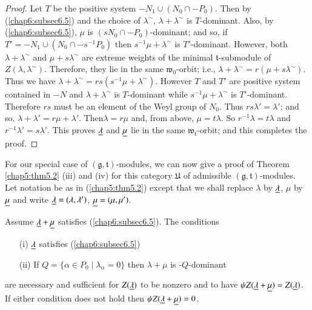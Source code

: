 \begin{proof}
Let $T$ be the positive system $-N_1 \cup (N_0 \cap -P_0)$. Then by
(\ref{chap6:subsec6.5}) and the choice of $\lambda^\sim$, $\lambda + \lambda^\sim$ is
$T$-dominant. Also, by (\ref{chap6:subsec6.5}), $\mu$ is $(sN_0 \cap -P_0)$-dominant;
and so, if $T'= - N_1 \cup (N_0 \cap - s^{-1}P_0)$ then $s^{-1} \mu +
\lambda^\sim$ is $T'$-dominant. However, both $\lambda + \lambda^\sim$
and $\mu + s \lambda^\sim$ are extreme weights of the minimal
$\mathfrak{t}$-submodule of $Z(\lambda, \lambda^\sim)$. Therefore,
they lie in the same $\mathfrak{w}_0$-orbit; i.e., $\lambda+
\lambda^\sim = r(\mu + s\lambda^\sim)$. Thus we have $\lambda +
\lambda^\sim = rs (s^{-1} \mu + \lambda^\sim)$. However $T$ and $T'$
are positive system contained in $-N$ and $\lambda + \lambda^\sim$ is
$T$-dominant while $s^{-1} \mu + \lambda^\sim$ is
$T'$-dominant. Therefore $rs$ must be an element of the Weyl group of
$N_0$. Thus $rs\lambda' = \lambda'$; and so, $\lambda+ \lambda' = r\mu
+ \lambda'$. Then\pageoriginale $\lambda = r\mu$ and, from above, $\mu
= t\lambda$. So $r^{-1} \lambda = t\lambda$ and $r^{-1} \lambda' =
s\lambda'$. This proves $\underline{\lambda}$ and $\underline{\mu}$ lie in the
same $\mathfrak{w}_\mathfrak{t}$-orbit; and this completes the proof. 
\end{proof}

For our special case of $(\mathfrak{g}, \mathfrak{t})$-modules, we can
now give a proof of Theorem \ref{chap5:thm5.2} (iii) and (iv) for this category
$\mathfrak{U}$ of admissible $(\mathfrak{g},
\mathfrak{t})$-modules. Let notation be as in (\ref{chap5:thm5.2}) except that we
shall replace $\lambda$ by $\underline{\lambda}$, $\mu$ by $\underline{\mu}$ and write
$\underline{\lambda} = (\lambda, \lambda')$, $\underline{\mu} = (\mu, \mu')$. 

\begin{prop}\label{chap10:prop10.9}
Assume $\underline{\lambda} + \underline{\mu}$ satisfies (\ref{chap6:subsec6.5}). The conditions
\begin{itemize}
\item[{\rm (i)}] $\underline{\lambda}$ satisfies (\ref{chap6:subsec6.5})

\item[{\rm (ii)}] If $Q = \{\alpha \in P_0 \mid \lambda_\alpha = 0\}$
  then $\lambda + \mu$ is -$Q$-dominant
\end{itemize}
are necessary and sufficient for $Z(\underline{\lambda})$ to be nonzero and to
have $\psi Z(\underline{\lambda} + \underline{\mu}) = Z(\underline{\lambda})$. If either
condition does not hold then $\psi Z(\underline{\lambda} + \underline{\mu}) = 0$. 
\end{prop}

